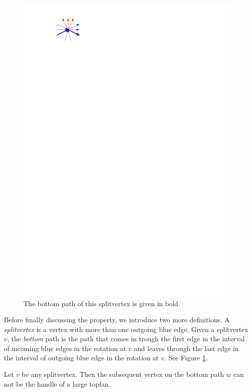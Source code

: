     \begin{figure}
      \centering
      \includegraphics[scale=.9]{unifiedAlgo/img/sweep/bottompath.pdf}
      \caption{The bottom path of this splitvertex is given in bold.}
      \label{fig:sweep:bottomPath}
    \end{figure}

    Before finally discussing the property, we introduce two more definitions.
    A \emph{splitvertex} is a vertex with more than one outgoing blue edge.
    Given a splitvertex $v$, the \emph{bottom} path is the path that comes in trough the first edge in the interval of incoming blue edges in the rotation at $v$ and leaves through the last edge in the interval of outgoing blue edge in the rotation at $v$.
    See Figure \ref{fig:sweep:bottomPath}.

    \begin{lemma}
      \label{lm:sweep:NoTwoSplitsAboveEachOther}
      Let $v$ be any splitvertex. Then the subsequent vertex on the bottom path $w$ can not be the handle of a large topfan.
    \end{lemma}

